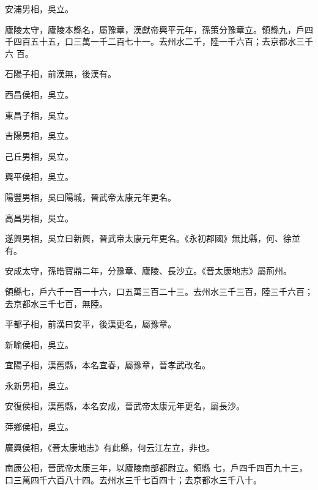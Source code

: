 \begin{pinyinscope}
 安浦男相，吳立。



 廬陵太守，廬陵本縣名，屬豫章，漢獻帝興平元年，孫策分豫章立。領縣九，戶四千四百五十五，口三萬一千二百七十一。去州水二千，陸一千六百；去京都水三千六
 百。



 石陽子相，前漢無，後漢有。



 西昌侯相，吳立。



 東昌子相，吳立。



 吉陽男相，吳立。



 己丘男相，吳立。



 興平侯相，吳立。



 陽豐男相，吳曰陽城，晉武帝太康元年更名。



 高昌男相，吳立。



 遂興男相，吳立曰新興，晉武帝太康元年更名。《永初郡國》無比縣，何、徐並有。



 安成太守，孫皓寶鼎二年，分豫章、廬陵、長沙立。《晉太康地志》屬荊州。



 領縣七，戶六千一百一十六，口五萬三百二十三。去州水三千三百，陸三千六百；去京都水三千七百，無陸。



 平都子相，前漢曰安平，後漢更名，屬豫章。



 新喻侯相，吳立。



 宜陽子相，漢舊縣，本名宜春，屬豫章，晉孝武改名。



 永新男相，吳立。



 安復侯相，漢舊縣，本名安成，晉武帝太康元年更名，屬長沙。



 萍鄉侯相，吳立。



 廣興侯相，《晉太康地志》有此縣，何云江左立，非也。



 南康公相，晉武帝太康三年，以廬陵南部都尉立。領縣
 七，戶四千四百九十三，口三萬四千六百八十四。去州水三千七百四十；去京都水三千八十。




\end{pinyinscope}
